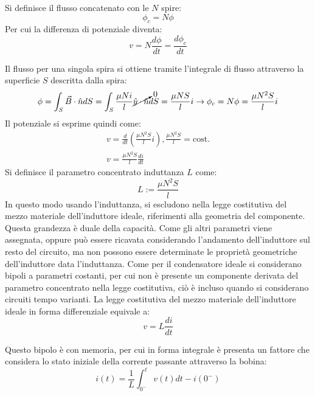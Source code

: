 \documentclass{article}
\numberwithin{equation}{subsection}
\begin{document}
Si definisce il flusso concatenato con le $N$ spire:
\begin{equation*}
    \phi_c=N\phi
\end{equation*}
Per cui la differenza di potenziale diventa:
\begin{equation*}
    v=N\displaystyle\frac{d\phi}{dt}=\frac{d\phi_c}{dt}
\end{equation*}

Il flusso per una singola spira si ottiene tramite l'integrale di flusso attraverso la superficie $S$ descritta dalla spira:
\begin{equation*}
    \phi=\displaystyle\int_S\vec{B}\cdot\hat{n}dS=\int_S\frac{\mu N i}{l}\cancelto{0}{\hat{y}\cdot\hat{n}}dS=\frac{\mu N S}{l}i\to \phi_c=N\phi=\frac{\mu N^2S}{l}i
\end{equation*}
Il potenziale si esprime quindi come:
\begin{gather*}
    v=\displaystyle\frac{d}{dt}\left(\frac{\mu N^2S}{l}i\right),\frac{\mu N^2S}{l}=\mbox{cost.}\\
    v=\displaystyle\frac{\mu N^2S}{l}\frac{di}{dt}
\end{gather*}
Si definisce il parametro concentrato induttanza $L$ come:
\begin{equation*}
    L:=\displaystyle\frac{\mu N^2S}{l}
\end{equation*} 
In questo modo usando l'induttanza, si escludono nella legge costitutiva del mezzo materiale dell'induttore ideale, riferimenti alla geometria del componente. Questa grandezza 
è duale della capacità. Come gli altri parametri viene assegnata, oppure può essere ricavata considerando l'andamento dell'induttore sul resto del circuito, ma non possono essere 
determinate le proprietà geometriche dell'induttore data l'induttanza. Come per il condensatore ideale si considerano bipoli a parametri costanti, per cui non è presente 
un componente derivata del parametro concentrato nella legge costitutiva, ciò è incluso quando si considerano circuiti tempo varianti.
La legge costitutiva del mezzo materiale dell'induttore ideale in forma differenziale equivale a:
\begin{equation}
    v=\displaystyle L\frac{di}{dt}
\end{equation}

Questo bipolo è con memoria, per cui in forma integrale è presenta un fattore che considera lo stato iniziale della corrente passante attraverso la bobina:
\begin{equation}
    i(t)=\displaystyle\frac{1}{L}\int_{0^-}^tv(t)dt-i(0^-)
\end{equation}
\end{document}
